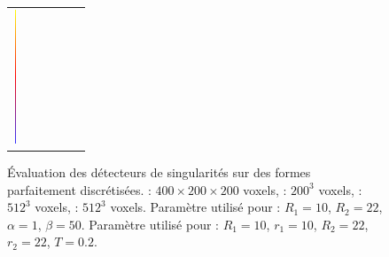 \begin{figure}[ht]
\begin{center}
\begin{tabular}{l c c c cl}
      \includegraphics[width=0.1cm,height=4cm]{images/YMTB6W}
    \end{tabular}
    \caption[Évaluation des détecteurs de singularités sur des formes parfaitement discrétisées.]{Évaluation des détecteurs de singularités sur des formes parfaitement discrétisées.
    \SpheresUnion : $400 \times 200 \times 200$ voxels, \CubeSphere : $200^3$ voxels, \Fandisk : $512^3$ voxels, \OctaFlower : $512^3$ voxels.
    Paramètre utilisé pour : $R_1 = 10$, $R_2 = 22$, $\alpha = 1$, $\beta = 50$.
    Paramètre utilisé pour : $R_1 = 10$, $r_1 = 10$, $R_2 = 22$, $r_2 = 22$, $T = 0.2$.\label{fig:feature-comparative}}
  \end{center}
\end{figure}

